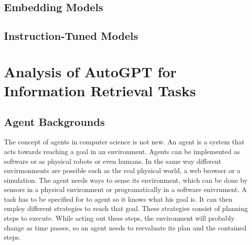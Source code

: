 \documentclass[english, version-2022-01]{uzl-thesis}
\begin{document}
\section{Embedding Models}


\section{Instruction-Tuned Models}






\chapter{Analysis of AutoGPT for Information Retrieval Tasks}


\section{Agent Backgrounds}

The concept of agents in computer science is not new.
An agent is a system that acts towards reaching a goal in an environment.
Agents can be implemented as software or as physical robots or even humans.
In the same way different envirmonments are possible such as the real physical world, a web browser or a simulation.
The agent needs ways to sense its environment, which can be done by sensors in a physical environment or programatically in a software enivrnment.
A task has to be specified for to agent so it knows what his goal is.
It can then employ different strategies to reach that goal. These strategies consist of planning steps to execute.
While acting out these steps, the environment will probably change as time passes, so an agent needs to reevaluate its plan and the contained steps.
\end{document}
